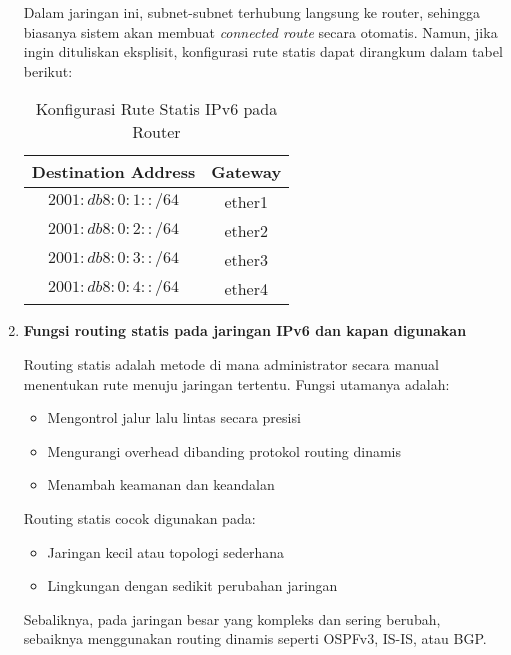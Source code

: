 \begin{enumerate}
	Dalam jaringan ini, subnet-subnet terhubung langsung ke router, sehingga biasanya sistem akan membuat \textit{connected route} secara otomatis. Namun, jika ingin dituliskan eksplisit, konfigurasi rute statis dapat dirangkum dalam tabel berikut:

	\begin{table}[h!]
		\centering
		\begin{tabular}{|c|c|}
			\hline
			\textbf{Destination Address} & \textbf{Gateway} \\
			\hline
			\(2001:db8:0:1::/64\) & ether1 \\
			\(2001:db8:0:2::/64\) & ether2 \\
			\(2001:db8:0:3::/64\) & ether3 \\
			\(2001:db8:0:4::/64\) & ether4 \\
			\hline
		\end{tabular}
		\caption{Konfigurasi Rute Statis IPv6 pada Router}
	\end{table}

	\item \textbf{Fungsi routing statis pada jaringan IPv6 dan kapan digunakan}

	Routing statis adalah metode di mana administrator secara manual menentukan rute menuju jaringan tertentu. Fungsi utamanya adalah:
	\begin{itemize}
		\item Mengontrol jalur lalu lintas secara presisi
		\item Mengurangi overhead dibanding protokol routing dinamis
		\item Menambah keamanan dan keandalan
	\end{itemize}

	Routing statis cocok digunakan pada:
	\begin{itemize}
		\item Jaringan kecil atau topologi sederhana
		\item Lingkungan dengan sedikit perubahan jaringan
	\end{itemize}

	Sebaliknya, pada jaringan besar yang kompleks dan sering berubah, sebaiknya menggunakan routing dinamis seperti OSPFv3, IS-IS, atau BGP.
\end{enumerate}

